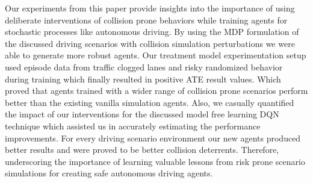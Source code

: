 \documentclass[a4, conference]{IEEEtran}
\begin{document}
    Our experiments from this paper provide insights into the importance of using deliberate interventions of collision prone behaviors while training agents for stochastic processes like autonomous driving. By using the MDP formulation of the discussed driving scenarios with collision simulation perturbations we were able to generate more robust agents. Our treatment model experimentation setup used episode data from traffic clogged lanes and risky randomized behavior during training which finally resulted in positive ATE result values. Which proved that agents trained with a wider range of collision prone scenarios perform better than the existing vanilla simulation agents. Also, we casually quantified the impact of our interventions for the discussed model free learning DQN technique which assisted us in accurately estimating the performance improvements. For every driving scenario environment our new agents produced better results and were proved to be better collision deterrents. Therefore, underscoring the importance of learning valuable lessons from risk prone scenario simulations for creating safe autonomous driving agents.






\end{document}
